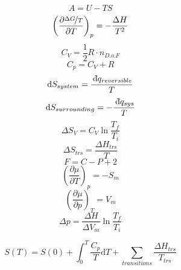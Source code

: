 \documentclass[12pt, letterpaper]{memoir}
\begin{document}
\begin{minipage}{0.5\linewidth}
	\begin{equation*}
		A = U-TS
	\end{equation*}
	\begin{equation*}
		\left(\dfrac{\partial \nicefrac{\Delta G}{T}}{\partial T}\right)_p=-\dfrac{\Delta H}{T^2}
	\end{equation*}
	\begin{equation*}
		C_V = \dfrac{1}{2}R\cdot n_{D.o.F}
	\end{equation*}
	\begin{equation*}
		C_p = C_V+R
	\end{equation*}
	\begin{equation*}
		\mathrm{d} S_{system} = \dfrac{~\dbar q_{reversible}}{T}
	\end{equation*}
	\begin{equation*}
		\mathrm{d} S_{surrounding} = -\dfrac{~\dbar q_{sys}}{T}
	\end{equation*}
	\begin{equation*}
		\Delta S_V=C_V\ln\dfrac{T_f}{T_i}
	\end{equation*}
	\begin{equation*}
		\Delta S_{trs}=\dfrac{\Delta H_{trs}}{T}
	\end{equation*}
	\begin{equation*}
		F=C-P+2
	\end{equation*}
	\begin{equation*}
		\left(\dfrac{\partial \mu}{\partial T}\right)_p=-S_m
	\end{equation*}
	\begin{equation*}
		\left(\dfrac{\partial \mu}{\partial p}\right)_T=V_m
	\end{equation*}
	\begin{equation*}
		\Delta p = \dfrac{\Delta H}{\Delta V_m}\ln\dfrac{T_f}{T_i}
	\end{equation*}
\end{minipage}

\begin{equation*}
	S(T)=S(0)+\int_0^T\dfrac{C_p}{T}\mathrm{d}T+\sum\limits_{transitions}\dfrac{\Delta H_{trs}}{T_{trs}}
\end{equation*}
\end{document}
